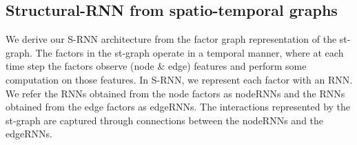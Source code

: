 \documentclass[10pt,twocolumn,letterpaper]{article}
\newcommand{\mcal}[1]{\mathcal{#1}}
\begin{document}
\iffalse
A node's label in the st-graph is affected by the factors the node is connected to in the factor-graph. We define {neighbor factors} to group the factors which jointly affect the node labels.  The node factor $\Psi_{V_p}$ and edge factor $\Psi_{E_m}$ are \textit{neighbors}, if there exist a node $v \in {V}$ such that it connects to both $\Psi_{V_p}$ and $\Psi_{E_m}$ in the factor graph. This definition will be instrumental in building the S-RNN architecture such that it captures the interactions in the st-graph.

\begin{align}
	\nonumber \Psi_{V_p} \;\&\; \Psi_{E_m}\; &\text{are neighbors} \Longleftrightarrow \\
	\label{eq:neighbor} &\exists v \in V_p, u \in \mcal{V}\; \text{s.t.}\; (u,v) \in E_m
\end{align}\fi\vspace{1\subsectionReduceTop}\subsection{Structural-RNN from spatio-temporal graphs}\vspace{1\subsectionReduceBot}\label{subsec:srnn}
We derive our S-RNN architecture from the factor graph representation of the st-graph. The factors in the st-graph operate in a temporal manner, where at each time step the factors observe (node \& edge) features and perform some computation on those features. In S-RNN, we represent each factor with an RNN. We refer the RNNs obtained from the node factors as nodeRNNs and the RNNs obtained from the edge factors as edgeRNNs. The interactions represented by the st-graph are captured through connections between the nodeRNNs and the edgeRNNs. 
\end{document}
